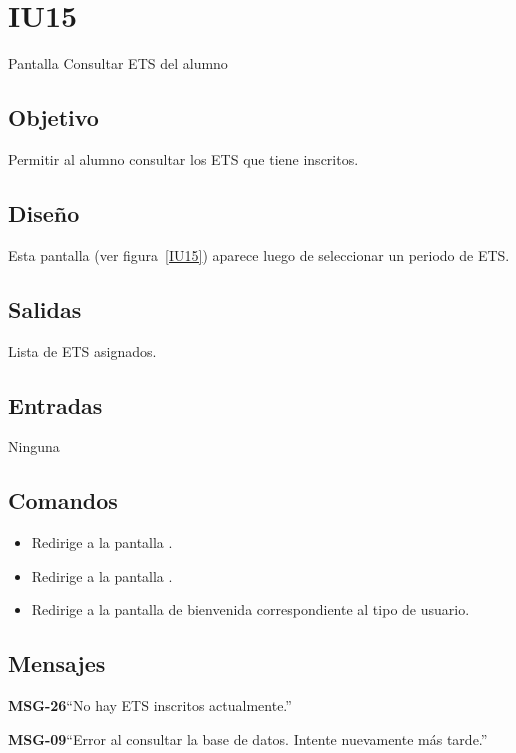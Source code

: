 \section{IU15} {Pantalla Consultar ETS del alumno}

\subsection{Objetivo}
Permitir al alumno consultar los ETS que tiene inscritos. 

\subsection{Diseño}
Esta pantalla  (ver figura~\ref{IU15}) aparece luego de seleccionar un periodo de ETS. 


\subsection{Salidas}
Lista de ETS asignados. 

\subsection{Entradas}
Ninguna


\subsection{Comandos}

\begin{itemize}
	\item {} Redirige a la pantalla .
	\item {} Redirige a la pantalla .
	\item {} Redirige a la pantalla de bienvenida correspondiente al tipo de usuario.
\end{itemize}
\subsection{Mensajes}

\begin{Citemize}
	\item {\bf MSG-26}{``No hay ETS inscritos actualmente.''}
	\item {\bf MSG-09}{``Error al consultar la base de datos. Intente nuevamente más tarde.''}
\end{Citemize}
